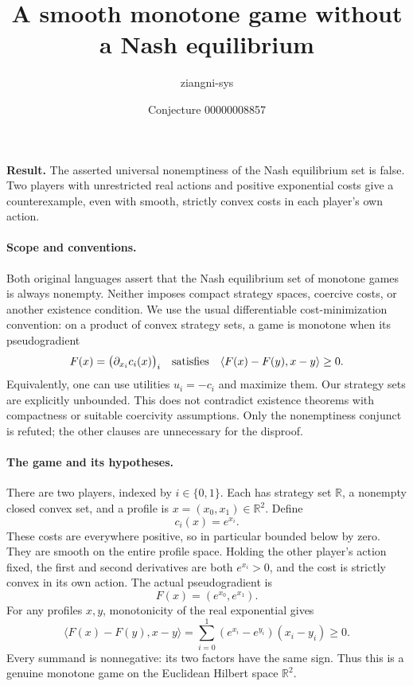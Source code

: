 \documentclass[11pt]{article}
\title{A smooth monotone game without a Nash equilibrium}
\author{ziangni-sys}
\date{Conjecture 00000008857}
\begin{document}
\raggedright
\maketitle
\noindent\textbf{Result.} The asserted universal nonemptiness of the Nash equilibrium set is false. Two players with unrestricted real actions and positive exponential costs give a counterexample, even with smooth, strictly convex costs in each player's own action.

\paragraph{Scope and conventions.}
Both original languages assert that the Nash equilibrium set of monotone games is always nonempty. Neither imposes compact strategy spaces, coercive costs, or another existence condition. We use the usual differentiable cost-minimization convention: on a product of convex strategy sets, a game is monotone when its pseudogradient
\[
F(x)=\bigl(\partial_{x_i}c_i(x)\bigr)_i
\quad\hbox{satisfies}\quad
\langle F(x)-F(y),x-y\rangle\geq0.
\]
Equivalently, one can use utilities $u_i=-c_i$ and maximize them. Our strategy sets are explicitly unbounded. This does not contradict existence theorems with compactness or suitable coercivity assumptions. Only the nonemptiness conjunct is refuted; the other clauses are unnecessary for the disproof.

\paragraph{The game and its hypotheses.}
There are two players, indexed by $i\in\{0,1\}$. Each has strategy set $\mathbb R$, a nonempty closed convex set, and a profile is $x=(x_0,x_1)\in\mathbb R^2$. Define
\[
c_i(x)=e^{x_i}.
\]
These costs are everywhere positive, so in particular bounded below by zero. They are smooth on the entire profile space. Holding the other player's action fixed, the first and second derivatives are both $e^{x_i}>0$, and the cost is strictly convex in its own action. The actual pseudogradient is
\[
F(x)=(e^{x_0},e^{x_1}).
\]
For any profiles $x,y$, monotonicity of the real exponential gives
\[
\langle F(x)-F(y),x-y\rangle
=\sum_{i=0}^{1}(e^{x_i}-e^{y_i})(x_i-y_i)\geq0.
\]
Every summand is nonnegative: its two factors have the same sign. Thus this is a genuine monotone game on the Euclidean Hilbert space $\mathbb R^2$.

\newpage
\end{document}
